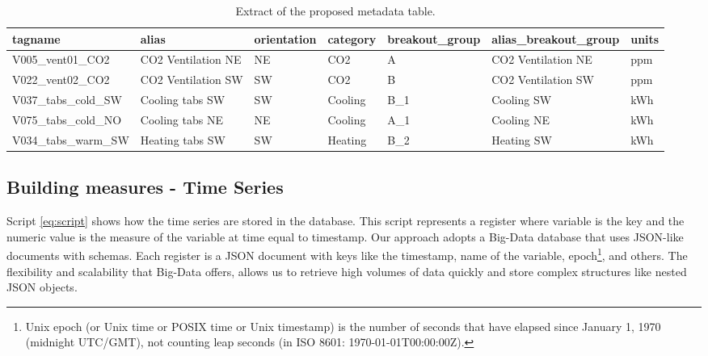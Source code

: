\begin{table}[htbp]
  \centering
  \scriptsize
  \caption{Extract of the proposed metadata table.}
    \begin{tabular}{|l|l|l|l|l|l|l|}
    \hline
    \rowcolor[rgb]{ 0,  0,  0} \textcolor[rgb]{ 1,  1,  1}{\textbf{tagname}} & \textcolor[rgb]{ 1,  1,  1}{\textbf{alias}} & \textcolor[rgb]{ 1,  1,  1}{\textbf{orientation}} & \textcolor[rgb]{ 1,  1,  1}{\textbf{category}} & \textcolor[rgb]{ 1,  1,  1}{\textbf{breakout\_group}} & \textcolor[rgb]{ 1,  1,  1}{\textbf{alias\_breakout\_group}} & \textcolor[rgb]{ 1,  1,  1}{\textbf{units}} \bigstrut\\
    \hline
    \rowcolor[rgb]{ .851,  .851,  .851} V005\_vent01\_CO2 & CO2 Ventilation NE & NE   & CO2  & A    & CO2 Ventilation NE & ppm \bigstrut\\
    \hline
    V022\_vent02\_CO2 & CO2 Ventilation SW & SW   & CO2  & B    & CO2 Ventilation SW & ppm \bigstrut\\
    \hline
    \rowcolor[rgb]{ .851,  .851,  .851} V037\_tabs\_cold\_SW & Cooling tabs SW & SW   & Cooling & B\_1 & Cooling SW & kWh \bigstrut\\
    \hline
    V075\_tabs\_cold\_NO & Cooling tabs NE & NE   & Cooling & A\_1 & Cooling NE & kWh \bigstrut\\
    \hline
    \rowcolor[rgb]{ .851,  .851,  .851} V034\_tabs\_warm\_SW & Heating tabs SW & SW   & Heating & B\_2 & Heating SW & kWh \bigstrut\\
    \hline
    \end{tabular}%
  \label{tab:Extarct of the Metadata}%
\end{table}%


\subsection{Building measures - Time Series}
\label{sec:dealing}
Script \ref{eq:script} shows how the time series are stored in the database. This script represents a register where variable is the key and the numeric value is the measure of the variable at time equal to timestamp. Our approach adopts a Big-Data database that uses JSON-like documents with schemas. Each register is a JSON document with keys like the timestamp, name of the variable, epoch\footnote{ Unix epoch (or Unix time or POSIX time or Unix timestamp) is the number of seconds that have elapsed since January 1, 1970 (midnight UTC/GMT), not counting leap seconds (in ISO 8601: 1970-01-01T00:00:00Z).}, and others. The flexibility and scalability that Big-Data offers, allows us to retrieve high volumes of data quickly and store complex structures like nested JSON objects. 

